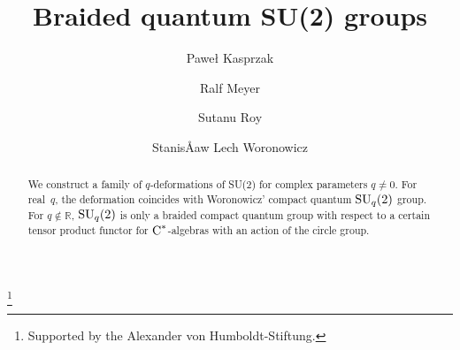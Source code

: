 \documentclass[a4paper]{amsart}
\numberwithin{equation}{section}
\theoremstyle{definition}
\theoremstyle{remark}
\begin{document}
\title{Braided quantum SU(2) groups}

\author[Kasprzak]{Pawe\l{} Kasprzak}
\address{Katedra Metod Matematycznych Fizyki\\
  WydziaÅ Fizyki, Uniwersytet Warszawski\\
  Pasteura 5\\02-093 Warszawa\\Poland}

\author[Meyer]{Ralf Meyer}
\address{Mathematisches Institut\\
  Georg-August UniversitÃ¤t GÃ¶ttingen\\
  BunsenstraÃe 3--5\\
  37073 GÃ¶ttingen\\
  Germany}

\author[Roy]{Sutanu Roy}
\address{Department of Mathematics and Statistics\\
  University of Ottawa\\
  585 King Edward Avenue\\
  Ottawa, ON K1N 6N5\\
  Canada}

\author[Woronowicz]{StanisÅaw Lech Woronowicz}
\address{Instytut Matematyki\\Uniwersytet w BiaÅymstoku, and\\
  Katedra Metod Matematycznych Fizyki\\
  WydziaÅ Fizyki, Uniwersytet Warszawski\\
  Pasteura 5, 02-093 Warszawa, Poland}

\begin{abstract}
  We construct a family of $q${\nobreakdash}-deformations of SU(2) for complex
  parameters $q\neq0$.  For real~$q$, the deformation coincides with
  Woronowicz' compact quantum ${\textup{SU}}_q(2)$ group.  For $q\notin
  \mathbb{R}$, ${\textup{SU}}_q(2)$ is only a braided compact quantum group
  with respect to a certain tensor product functor for
  \({\textup{C}^*}\){\nobreakdash}-algebras with an action of the circle group.
\end{abstract}

\thanks{Supported by the Alexander von Humboldt-Stiftung.}

\maketitle
\end{document}
